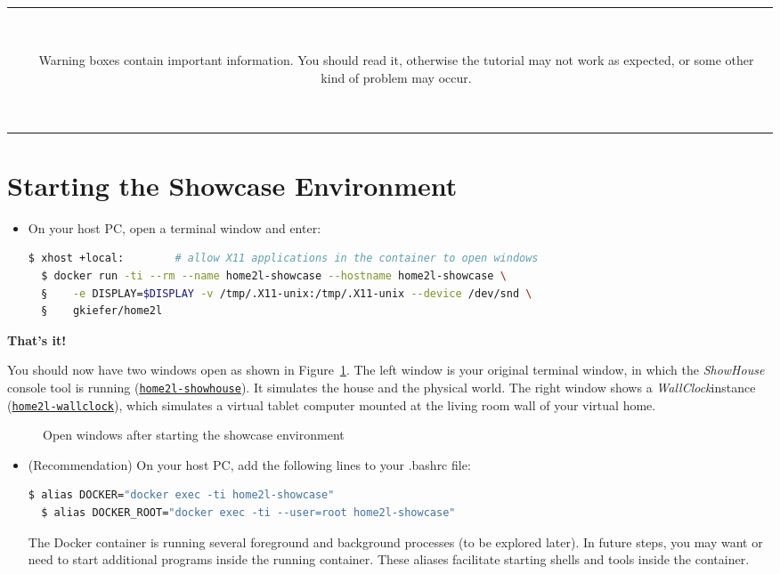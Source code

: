 \documentclass[12pt,english,parskip=half,headheight=19pt]{scrreprt}
\newcommand{\figsvg}[2][]{}            %
\newcommand{\figsvg}[2][]{\href{#2}{}} %
\newcommand{\lstf}[1]{\colorbox{lstbackground}{\ttfamily\footnotesize#1}}
\newcommand{\warnbox}[1]{
  \par
  \medskip
  \hfill
  \setlength\arrayrulewidth{1pt}
  \begin{tabular}[b]{c|c|}
    
    &
    \,\parbox{0.89\linewidth}{\setlength{\parskip}{0.5em}#1}\,
  \end{tabular}
  \medskip
  \par
}
\newcommand{\idx}[1]{#1\index{#1}}
\newcommand{\reftool}[1]{\hyperref[tool:#1]{\texttt{\idx{#1}}}}
\begin{document}
\warnbox{
  Warning boxes contain important information. You should read it, otherwise the tutorial may not work
  as expected, or some other kind of problem may occur.
}





\clearpage
\section{Starting the Showcase Environment}
\label{sec:tutorial-start}


\begin{itemize}[$\blacktriangleright$]

\item
  On your host PC, open a terminal window and enter:
  \begin{lstlisting}[language=bash]
  $ xhost +local:        # allow X11 applications in the container to open windows
  $ docker run -ti --rm --name home2l-showcase --hostname home2l-showcase \
  §    -e DISPLAY=$DISPLAY -v /tmp/.X11-unix:/tmp/.X11-unix --device /dev/snd \
  §    gkiefer/home2l
  \end{lstlisting}

\end{itemize}

\textbf{That's it!}

You should now have two windows open as shown in Figure~\ref{fig:tutorial-start}. The left window is your original terminal window, in which the \textit{ShowHouse} console tool is running (\reftool{home2l-showhouse}). It simulates the house and the physical world. The right window shows a \textit{WallClock}instance (\reftool{home2l-wallclock}), which simulates a virtual tablet computer mounted at the living room wall of your virtual home.

\begin{figure}[ht]
  \centering
  \figsvg[width=0.95\linewidth,keepaspectratio]{figs/tutorial-start.svg}
  \caption[l]{Open windows after starting the showcase environment}
  \label{fig:tutorial-start}
\end{figure}

\begin{itemize}[$\blacktriangleright$]
\item
  (Recommendation) On your host PC, add the following lines to your \lstf{.bashrc} file:
  \begin{lstlisting}[language=bash]
  $ alias DOCKER="docker exec -ti home2l-showcase"
  $ alias DOCKER_ROOT="docker exec -ti --user=root home2l-showcase"
  \end{lstlisting}
  The Docker container is running several foreground and background processes (to be explored later).
  In future steps, you may want or need to start additional programs inside the running container.
  These aliases facilitate starting shells and tools inside the container.
\end{itemize}
\end{document}
